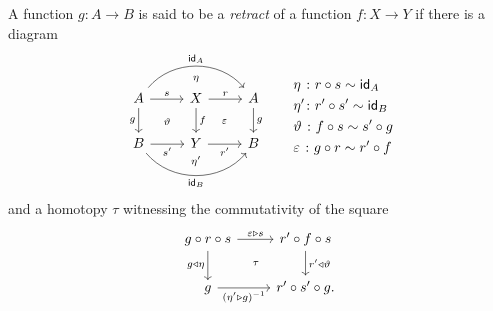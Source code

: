\begin{defn}\label{defn:function-retract}
    A function $g\colon A\to B$ is said to be a \textsl{retract} of a function $f\colon X\to Y$ if there is a diagram
    \begin{equation}\label{tik:retraction-1}
        \begin{tikzcd}
            A
                    \arrow[rr,"\scriptstyle\eta"',phantom,bend left=30]
                    \arrow[rr,"\id_A",bend left=50]
                    \arrow[r,"s"]
                    \arrow[d,"g"']
                    \arrow[rd,
                        phantom,
                        "\scriptstyle\vartheta"]
                &X
                    \arrow[rd,
                        phantom,
                        "\scriptstyle\varepsilon"]
                    \arrow[r,"r"]
                    \arrow[d,"f"]
                &A
                    \arrow[d,"g"]\\
            B
                    \arrow[r,"s'"']
                    \arrow[rr,
                        "\scriptstyle\eta'"',
                        bend right=25,
                        phantom]
                    \arrow[rr,"\id_B"',bend right=50]
                &Y
                    \arrow[r,"r'"']
                &B
        \end{tikzcd}
        \qquad
        \begin{aligned}
            &\eta\hphantom'\colon r\circ s\sim\id_A\\
            &\eta'\colon r'\circ s'\sim\id_B\\
            &\vartheta\hphantom'\colon f\circ s\sim s'\circ g\\
            &\varepsilon\hphantom'\colon g\circ r\sim r'\circ f
        \end{aligned}        
    \end{equation}
    and a homotopy $\tau$ witnessing the commutativity of the square
    \begin{equation}\label{tik:retraction-2}
        \begin{tikzcd}
            g\circ r\circ s
                    \arrow[r,"\varepsilon\rwct s"]
                    \arrow[d,"g\lwct\eta"']
                    \arrow[rd,
                        phantom,
                        "\scriptstyle\tau"]
                &r'\circ f\circ s
                    \arrow[d,"r'\lwct\vartheta"]\\
            g
                    \arrow[r,"(\eta'\rwct g)^{-1}"']
                &r'\circ s'\circ g.
        \end{tikzcd}
    \end{equation}
\end{defn}

